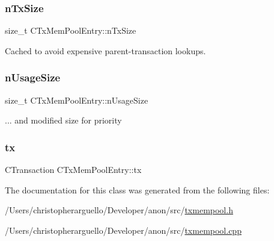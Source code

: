 \subsubsection{\texorpdfstring{n\+Tx\+Size}{nTxSize}}
{\footnotesize\ttfamily size\+\_\+t C\+Tx\+Mem\+Pool\+Entry\+::n\+Tx\+Size\hspace{0.3cm}{\ttfamily [private]}}



Cached to avoid expensive parent-\/transaction lookups. 

\mbox{\label{class_c_tx_mem_pool_entry_a46110a49dc627ae6c08e5710f1e038cb}} 
\subsubsection{\texorpdfstring{n\+Usage\+Size}{nUsageSize}}
{\footnotesize\ttfamily size\+\_\+t C\+Tx\+Mem\+Pool\+Entry\+::n\+Usage\+Size\hspace{0.3cm}{\ttfamily [private]}}



... and modified size for priority 

\mbox{\label{class_c_tx_mem_pool_entry_a8b320073dcb7010fbd19b100c8e13e57}} 
\subsubsection{\texorpdfstring{tx}{tx}}
{\footnotesize\ttfamily C\+Transaction C\+Tx\+Mem\+Pool\+Entry\+::tx\hspace{0.3cm}{\ttfamily [private]}}



The documentation for this class was generated from the following files\+:\begin{DoxyCompactItemize}
\item 
/\+Users/christopherarguello/\+Developer/anon/src/\mbox{\hyperlink{txmempool_8h}{txmempool.\+h}}\item 
/\+Users/christopherarguello/\+Developer/anon/src/\mbox{\hyperlink{txmempool_8cpp}{txmempool.\+cpp}}\end{DoxyCompactItemize}
